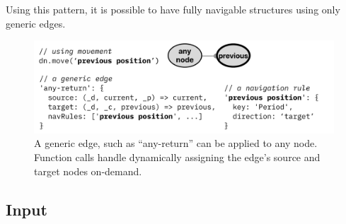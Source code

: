 \documentclass[journal]{vgtc}                %
\begin{document}
Using this pattern, it is possible to have fully navigable structures using only generic edges.

\begin{figure}[h]
  \centering
  \includegraphics[width=\linewidth]{figures/dynamic_movement.png}
  \caption{A generic edge, such as ``any-return'' can be applied to any node. Function calls handle dynamically assigning the edge's source and target nodes on-demand.}
  \label{dynamic_movement}
\end{figure}

\subsection{Input}
\end{document}

